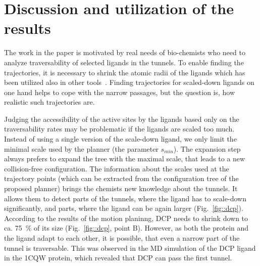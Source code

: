 \documentclass[usletter, 10pt, conference]{ieeeconf} %
\def\smin{s_{min}}
\begin{document}
\section{Discussion and utilization of the results}

The work in the paper is motivated by real needs of bio-chemists who need to analyze traversability of selected ligands in the tunnels.
To enable finding the trajectories, it is necessary to shrink the atomic radii of the ligands which has been utilized also in other tools~\cite{cortes2005path,guieysse2008structure}.
Finding trajectories for scaled-down ligands on one hand helps to cope with the narrow passages, but the question is, how realistic
such trajectories are.

Judging the accessibility of the active sites by the ligands based only on the traversability rates may be problematic if the ligands are scaled too much.
Instead of using a single version of the scale-down ligand, we only limit the minimal scale used by the planner (the parameter $\smin$).
The expansion step always prefers to expand the tree with the maximal scale, that leads to a new collision-free configuration.
The information about the scales used at the trajectory points (which can be extracted from the configuration tree of the proposed planner) brings the chemists new knowledge about the tunnels.
It allows them to detect parts of the tunnels, where the ligand has to scale-down significantly, and parts, where the ligand can be again
larger (Fig.~\ref{fig::dcp}).
According to the results of the motion planinng, DCP needs to shrink down to ca. 75~\% of its size (Fig.~\ref{fig::dcp}, point B).
However, as both the protein and the ligand adapt to each other, it is possible, that even a narrow part of the tunnel is traversable.
This was observed in the MD simulation of the DCP ligand in the 1CQW protein, which revealed that DCP can pass the first tunnel.

\end{document}
